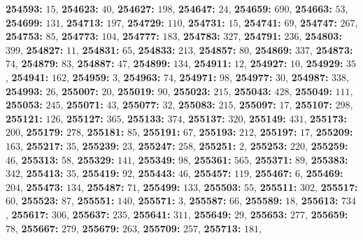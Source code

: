\textsf{\bfseries 254593:} $15$, \textsf{\bfseries 254623:} $40$, \textsf{\bfseries 254627:} $198$, \textsf{\bfseries 254647:} $24$, \textsf{\bfseries 254659:} $690$, \textsf{\bfseries 254663:} $53$, \textsf{\bfseries 254699:} $131$, \textsf{\bfseries 254713:} $197$, \textsf{\bfseries 254729:} $110$, \textsf{\bfseries 254731:} $15$, \textsf{\bfseries 254741:} $69$, \textsf{\bfseries 254747:} $267$, \textsf{\bfseries 254753:} $85$, \textsf{\bfseries 254773:} $104$, \textsf{\bfseries 254777:} $183$, \textsf{\bfseries 254783:} $327$, \textsf{\bfseries 254791:} $236$, \textsf{\bfseries 254803:} $399$, \textsf{\bfseries 254827:} $11$, \textsf{\bfseries 254831:} $65$, \textsf{\bfseries 254833:} $213$, \textsf{\bfseries 254857:} $80$, \textsf{\bfseries 254869:} $337$, \textsf{\bfseries 254873:} $74$, \textsf{\bfseries 254879:} $83$, \textsf{\bfseries 254887:} $47$, \textsf{\bfseries 254899:} $134$, \textsf{\bfseries 254911:} $12$, \textsf{\bfseries 254927:} $10$, \textsf{\bfseries 254929:} $35$, \textsf{\bfseries 254941:} $162$, \textsf{\bfseries 254959:} $3$, \textsf{\bfseries 254963:} $74$, \textsf{\bfseries 254971:} $98$, \textsf{\bfseries 254977:} $30$, \textsf{\bfseries 254987:} $338$, \textsf{\bfseries 254993:} $26$, \textsf{\bfseries 255007:} $20$, \textsf{\bfseries 255019:} $90$, \textsf{\bfseries 255023:} $215$, \textsf{\bfseries 255043:} $428$, \textsf{\bfseries 255049:} $111$, \textsf{\bfseries 255053:} $245$, \textsf{\bfseries 255071:} $43$, \textsf{\bfseries 255077:} $32$, \textsf{\bfseries 255083:} $215$, \textsf{\bfseries 255097:} $17$, \textsf{\bfseries 255107:} $298$, \textsf{\bfseries 255121:} $126$, \textsf{\bfseries 255127:} $365$, \textsf{\bfseries 255133:} $374$, \textsf{\bfseries 255137:} $320$, \textsf{\bfseries 255149:} $431$, \textsf{\bfseries 255173:} $200$, \textsf{\bfseries 255179:} $278$, \textsf{\bfseries 255181:} $85$, \textsf{\bfseries 255191:} $67$, \textsf{\bfseries 255193:} $212$, \textsf{\bfseries 255197:} $17$, \textsf{\bfseries 255209:} $163$, \textsf{\bfseries 255217:} $35$, \textsf{\bfseries 255239:} $23$, \textsf{\bfseries 255247:} $258$, \textsf{\bfseries 255251:} $2$, \textsf{\bfseries 255253:} $220$, \textsf{\bfseries 255259:} $46$, \textsf{\bfseries 255313:} $58$, \textsf{\bfseries 255329:} $141$, \textsf{\bfseries 255349:} $98$, \textsf{\bfseries 255361:} $565$, \textsf{\bfseries 255371:} $89$, \textsf{\bfseries 255383:} $342$, \textsf{\bfseries 255413:} $35$, \textsf{\bfseries 255419:} $92$, \textsf{\bfseries 255443:} $46$, \textsf{\bfseries 255457:} $119$, \textsf{\bfseries 255467:} $6$, \textsf{\bfseries 255469:} $204$, \textsf{\bfseries 255473:} $134$, \textsf{\bfseries 255487:} $71$, \textsf{\bfseries 255499:} $133$, \textsf{\bfseries 255503:} $55$, \textsf{\bfseries 255511:} $302$, \textsf{\bfseries 255517:} $60$, \textsf{\bfseries 255523:} $87$, \textsf{\bfseries 255551:} $140$, \textsf{\bfseries 255571:} $3$, \textsf{\bfseries 255587:} $66$, \textsf{\bfseries 255589:} $18$, \textsf{\bfseries 255613:} $734$, \textsf{\bfseries 255617:} $306$, \textsf{\bfseries 255637:} $235$, \textsf{\bfseries 255641:} $311$, \textsf{\bfseries 255649:} $29$, \textsf{\bfseries 255653:} $277$, \textsf{\bfseries 255659:} $78$, \textsf{\bfseries 255667:} $279$, \textsf{\bfseries 255679:} $263$, \textsf{\bfseries 255709:} $257$, \textsf{\bfseries 255713:} $181$, 
